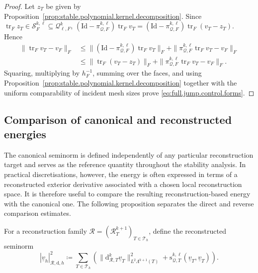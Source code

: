 \documentclass[a4paper,11pt]{article}
\theoremstyle{definition}
\newcommand{\DIFF}{\mathrm{d}}
\newcommand{\Qtrace}[2]{\mathcal Q_{\ell,#1}^{#2}}
\newcommand{\piQ}[2]{\pi_{\mathcal Q,#1}^{#2,\ell}}
\newcommand{\trc}{\operatorname{tr}}
\begin{document}
\begin{proof}
Let $z_T$ be given by Proposition~\ref{prop:stable.polynomial.kernel.decomposition}.
Since $\trc_Fz_T\in\mathcal S_F^{k,\ell}\subseteq\Qtrace{F}{k}$, $(\mathrm{Id}-\piQ{F}{k})\trc_Fv_T = (\mathrm{Id}-\piQ{F}{k})\trc_F(v_T-z_T)$.
Hence
\[
\begin{aligned}
  \|\trc_Fv_T-v_F\|_F
  &\leq
  \|(\mathrm{Id}-\piQ{F}{k})\trc_Fv_T\|_F
  +
  \|\piQ{F}{k}\trc_Fv_T-v_F\|_F
  \\
  &\leq
  \|\trc_F(v_T-z_T)\|_F
  +
  \|\piQ{F}{k}\trc_Fv_T-v_F\|_F.
\end{aligned}
\]
Squaring, multiplying by $h_F^{-1}$, summing over the faces, and using Proposition~\ref{prop:stable.polynomial.kernel.decomposition} together with the uniform comparability of incident mesh sizes prove \eqref{eq:full.jump.control.forms}.
\end{proof}

\subsection{Comparison of canonical and reconstructed energies}
\label{subsec:hybrid.energy.comparison}

The canonical seminorm is defined independently of any particular reconstruction target and serves as the reference quantity throughout the stability analysis.
In practical discretisations, however, the energy is often expressed in terms of a reconstructed exterior derivative associated with a chosen local reconstruction space.
It is therefore useful to compare the resulting reconstruction-based energy with the canonical one.
The following proposition separates the direct and reverse comparison estimates.

For a reconstruction family $\mathcal R=(\mathcal R_T^{k+1})_{T\in\mathcal T_h}$, define the reconstructed seminorm
\[
  |\underline v_h|_{\mathcal R,\DIFF,h}^2
  \coloneqq
  \sum_{T\in\mathcal T_h}
  \left(
    \|\DIFF_{\mathcal R,T}^{k}\underline v_T\|_{L^2\Lambda^{k+1}(T)}^2
    +
    \mathrm s_{\mathcal Q,T}^{k,\ell}
    (\underline v_T,\underline v_T)
  \right).
\]
\end{document}
